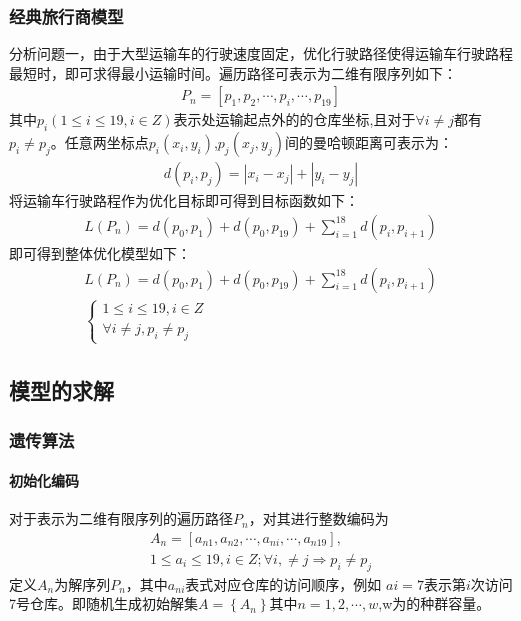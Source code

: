 \documentclass{whutmod}
\begin{document}
	    \subsubsection{经典旅行商模型}
	    分析问题一，由于大型运输车的行驶速度固定，优化行驶路径使得运输车行驶路程最短时，即可求得最小运输时间。遍历路径可表示为二维有限序列如下：
	     \begin{gather}
	    P_n=[p_{1},p_{2},\cdots,p_{i},\cdots,p_{19}]
	    \end{gather}
	    其中$p_{i}(1\leqslant i \leqslant 19 ,i\in Z)$表示处运输起点外的的仓库坐标,且对于$\forall i \neq j$都有$p_i \neq p_j $。任意两坐标点$p_i(x_i,y_i)$,$p_j(x_j,y_j)$间的曼哈顿距离可表示为：
	     \begin{gather}
	     d(p_i,p_j)=\left | x_i-x_j \right |+\left | y_i-y_j \right |
	     \end{gather}
	    将运输车行驶路程作为优化目标即可得到目标函数如下：
	    \begin{gather}
	    L(P_n)=d(p_0,p_{1})+d(p_0,p_{19})+\sum_{i=1}^{18}d(p_i,p_{i+1})
	    \end{gather}
	    即可得到整体优化模型如下：
	    \begin{gather}
	    L(P_n)=d(p_0,p_{1})+d(p_0,p_{19})+\sum_{i=1}^{18}d(p_i,p_{i+1})\\
	    \left\{\begin{matrix}1\leqslant i \leqslant 19 ,i\in Z
	    \\ \forall i \neq j,p_i \neq p_j 
	    \end{matrix}\right.
        \end{gather}
        \subsection{模型的求解}
        \subsubsection{遗传算法}
        \paragraph{初始化编码}
        对于表示为二维有限序列的遍历路径$P_n$，对其进行整数编码为
        \begin{gather}
        A_n=[a_{n1},a_{n2},\cdots,a_{ni},\cdots,a_{n19}], \\
        1\leqslant a_i \leqslant 19 ,i\in Z ;\forall i, \neq j\Rightarrow p_i \neq p_j 
        \end{gather}
        定义$A_n$为解序列$P_{n}$，其中$a_{ni}$表式对应仓库的访问顺序，例如 $a{i}=7$表示第$i$次访问7号仓库。即随机生成初始解集$A=\left \{A_n\right \}$其中$n=1,2,\cdots,w$,w为的种群容量。
\end{document}
